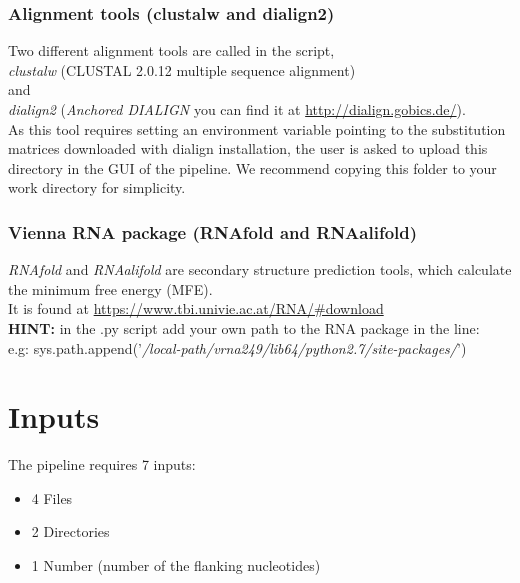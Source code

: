 \documentclass[a4paper,20pt]{report}
\begin{document}
  

\subsection{Alignment tools (clustalw and dialign2)}
\noindent
Two different alignment tools are called in the script,\\
\textit{clustalw} (CLUSTAL 2.0.12 multiple sequence alignment)\\
and\\
\textit{dialign2} (\textit{Anchored DIALIGN} you can find it at \url{http://dialign.gobics.de/}).\\ 
As  this tool requires setting 
an environment variable pointing to the substitution matrices downloaded with dialign installation, the user is asked to
upload this directory in the GUI of the pipeline. We recommend copying this folder to your work directory for simplicity.
\subsection{Vienna RNA package (RNAfold and RNAalifold)}
\noindent
\textit{RNAfold} and \textit{RNAalifold} are secondary structure prediction tools, which calculate the minimum free energy
(MFE).\\
It is found at \url{ https://www.tbi.univie.ac.at/RNA/#download}\\
\textbf{HINT:} in the .py script add your own path to the RNA package in the line:\\
e.g: sys.path.append('\textit{/local-path/vrna249/lib64/python2.7/site-packages/}')

\chapter*{Inputs}
\label{chap:inputs}
The pipeline requires 7 inputs:
  \begin{itemize}
   \item 4 Files
   \item 2 Directories
   \item 1 Number (number of the flanking nucleotides)
  \end{itemize}
\end{document}
